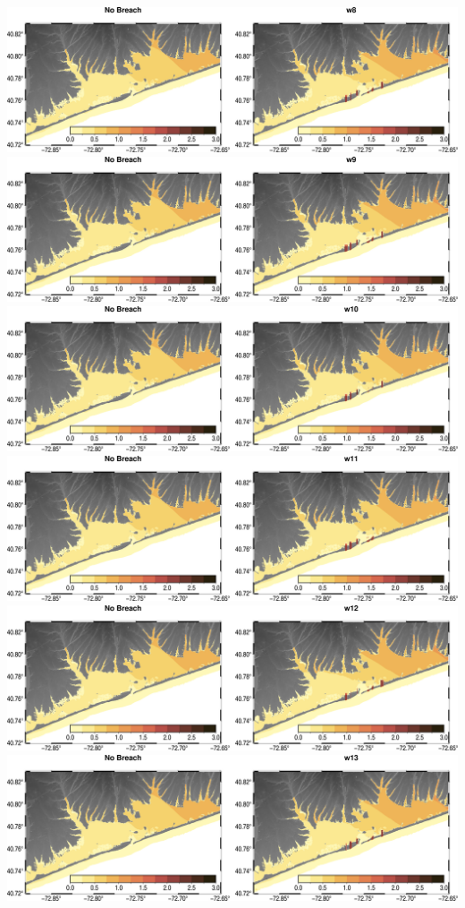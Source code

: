 \includegraphics[width=\textwidth]{images/fgmax/w8_fgmax_no_lines.png}
\includegraphics[width=\textwidth]{images/fgmax/w9_fgmax_no_lines.png}
\includegraphics[width=\textwidth]{images/fgmax/w10_fgmax_no_lines.png}
\includegraphics[width=\textwidth]{images/fgmax/w11_fgmax_no_lines.png}
\includegraphics[width=\textwidth]{images/fgmax/w12_fgmax_no_lines.png}
\includegraphics[width=\textwidth]{images/fgmax/w13_fgmax_no_lines.png}
